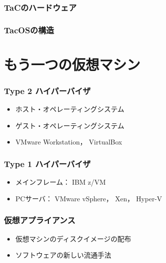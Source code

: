 \documentclass[dvipdfmx]{beamer}
\begin{document}
\begin{frame}
  \frametitle{TaCのハードウェア}
\end{frame}

\begin{frame}
  \frametitle{TacOSの構造}
\end{frame}

\section{もう一つの仮想マシン}
\begin{frame}
  \frametitle{Type 2 ハイパーバイザ}
  \begin{itemize}
  \item ホスト・オペレーティングシステム
  \item ゲスト・オペレーティングシステム
  \item VMware Workstation， VirtualBox
  \end{itemize}
\end{frame}

\begin{frame}
  \frametitle{Type 1 ハイパーバイザ}
  \begin{itemize}
  \item メインフレーム： IBM z/VM
  \item PCサーバ： VMware vSphere， Xen， Hyper-V
  \end{itemize}
\end{frame}

\begin{frame}
  \frametitle{仮想アプライアンス}
  \begin{itemize}
  \item 仮想マシンのディスクイメージの配布
  \item ソフトウェアの新しい流通手法
  \end{itemize}
\end{frame}
\end{document}
